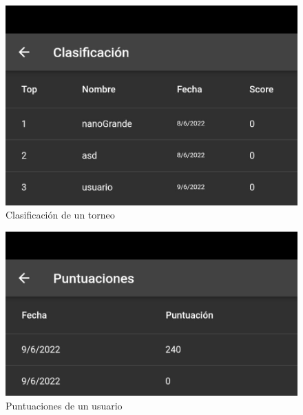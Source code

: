 \documentclass{article}
\begin{document}
\begin{figure}[H]
  \includegraphics[width=\textwidth]{imagenes/clasTorneo.jpeg}
  \caption{Clasificación de un torneo} 
\end{figure} 

\begin{figure}[H]
  \includegraphics[width=\textwidth]{imagenes/clasInd.jpeg}
  \caption{Puntuaciones de un usuario} 
\end{figure} 
\end{document}
